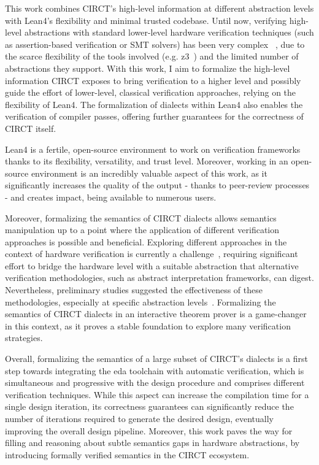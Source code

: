 \documentclass[sigconf,authorversion,nonacm, 11pt]{acmart}
\begin{document}
This work combines CIRCT's high-level information at different abstraction levels with Lean4's flexibility and minimal trusted codebase. 
Until now, verifying high-level abstractions with standard lower-level hardware verification techniques (such as assertion-based verification or SMT solvers) has been very complex ~\cite{symbiyosys, witharana2022survey}, due to the scarce flexibility of the tools involved (e.g. z3~\cite{de2008z3}) and the limited number of abstractions they support. 
With this work, I aim to formalize the high-level information CIRCT exposes to bring verification to a higher level and possibly guide the effort of lower-level, classical verification approaches, relying on the flexibility of Lean4.
The formalization of dialects within Lean4 also enables the verification of compiler passes, offering further guarantees for the correctness of CIRCT itself. 

Lean4 is a fertile, open-source environment to work on verification frameworks thanks to its flexibility, versatility, and trust level. 
Moreover, working in an open-source environment is an incredibly valuable aspect of this work, as it significantly increases the quality of the output - thanks to peer-review processes - and creates impact, being available to numerous users.  

Moreover, formalizing the semantics of CIRCT dialects allows semantics manipulation up to a point where the application of different verification approaches is possible and beneficial. 
Exploring different approaches in the context of hardware verification is currently a challenge~\cite{mukherjee2015hardware, malik2008hardware}, requiring significant effort to bridge the hardware level with a suitable abstraction that alternative verification methodologies, such as abstract interpretation frameworks, can digest. 
Nevertheless, preliminary studies suggested the effectiveness of these methodologies, especially at specific abstraction levels~\cite{bernstein2021semantics}. 
Formalizing the semantics of CIRCT dialects in an interactive theorem prover is a game-changer in this context, as it proves a stable foundation to explore many verification strategies.

Overall, formalizing the semantics of a large subset of CIRCT's dialects is a first step towards integrating the \ac{eda} toolchain with automatic verification, which is simultaneous and progressive with the design procedure and comprises different verification techniques. 
While this aspect can increase the compilation time for a single design iteration, its correctness guarantees can significantly reduce the number of iterations required to generate the desired design, eventually improving the overall design pipeline.
Moreover, this work paves the way for filling and reasoning about subtle semantics gaps in hardware abstractions, by introducing formally verified semantics in the CIRCT ecosystem.
\end{document}
